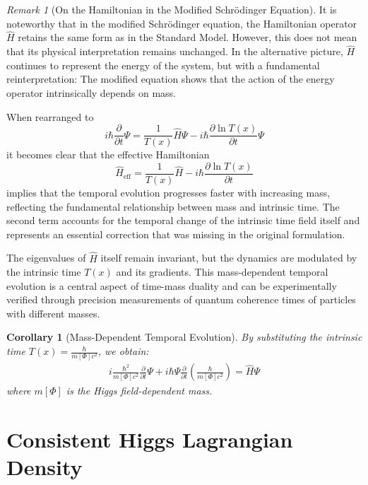 \documentclass{article}
\newtheorem{corollary}[theorem]{Corollary}
\theoremstyle{definition}
\theoremstyle{remark}
\newtheorem{remark}[theorem]{Remark}
\newcommand{\Tfield}{T(x)} %
\begin{document}
	\begin{remark}[On the Hamiltonian in the Modified Schrödinger Equation]
		It is noteworthy that in the modified Schrödinger equation, the Hamiltonian operator $\hat{H}$ retains the same form as in the Standard Model. However, this does not mean that its physical interpretation remains unchanged. In the alternative picture, $\hat{H}$ continues to represent the energy of the system, but with a fundamental reinterpretation: The modified equation shows that the action of the energy operator intrinsically depends on mass. 
		
		When rearranged to 
		\begin{equation}
			i\hbar\frac{\partial}{\partial t}\Psi = \frac{1}{\Tfield}\hat{H}\Psi - i\hbar\frac{\partial \ln \Tfield}{\partial t}\Psi
		\end{equation}
		it becomes clear that the effective Hamiltonian 
		\begin{equation}
			\hat{H}_{\text{eff}} = \frac{1}{\Tfield}\hat{H} - i\hbar\frac{\partial \ln \Tfield}{\partial t}
		\end{equation}
		implies that the temporal evolution progresses faster with increasing mass, reflecting the fundamental relationship between mass and intrinsic time. The second term accounts for the temporal change of the intrinsic time field itself and represents an essential correction that was missing in the original formulation.
		
		The eigenvalues of $\hat{H}$ itself remain invariant, but the dynamics are modulated by the intrinsic time $\Tfield$ and its gradients. This mass-dependent temporal evolution is a central aspect of time-mass duality and can be experimentally verified through precision measurements of quantum coherence times of particles with different masses.
	\end{remark}
	
	\begin{corollary}[Mass-Dependent Temporal Evolution]
		By substituting the intrinsic time $\Tfield = \frac{\hbar}{m[\Phi]c^2}$, we obtain:
		\begin{multline}
			i\frac{\hbar^2}{m[\Phi]c^2}\frac{\partial}{\partial t}\Psi + i\hbar\Psi\frac{\partial}{\partial t}\left(\frac{\hbar}{m[\Phi]c^2}\right) = \hat{H}\Psi
		\end{multline}
		where $m[\Phi]$ is the Higgs field-dependent mass.
	\end{corollary}
	
	\section{Consistent Higgs Lagrangian Density}
	
\end{document}
